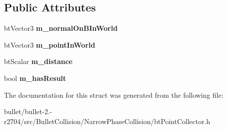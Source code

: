 \subsection*{Public Attributes}
\begin{DoxyCompactItemize}
\item 
\hypertarget{structbt_point_collector_a3fd61b2d8440ac2bc2fa9bb6061eea34}{bt\+Vector3 {\bfseries m\+\_\+normal\+On\+B\+In\+World}}\label{structbt_point_collector_a3fd61b2d8440ac2bc2fa9bb6061eea34}

\item 
\hypertarget{structbt_point_collector_ad10b05207fe3a122c99e35e153438964}{bt\+Vector3 {\bfseries m\+\_\+point\+In\+World}}\label{structbt_point_collector_ad10b05207fe3a122c99e35e153438964}

\item 
\hypertarget{structbt_point_collector_a8b957ea0488b58bf9d49bda1b0fa596d}{bt\+Scalar {\bfseries m\+\_\+distance}}\label{structbt_point_collector_a8b957ea0488b58bf9d49bda1b0fa596d}

\item 
\hypertarget{structbt_point_collector_ac7b16569176ef840415c9ea000325b92}{bool {\bfseries m\+\_\+has\+Result}}\label{structbt_point_collector_ac7b16569176ef840415c9ea000325b92}

\end{DoxyCompactItemize}


The documentation for this struct was generated from the following file\+:\begin{DoxyCompactItemize}
\item 
bullet/bullet-\/2.-\/r2704/src/\+Bullet\+Collision/\+Narrow\+Phase\+Collision/bt\+Point\+Collector.\+h\end{DoxyCompactItemize}
